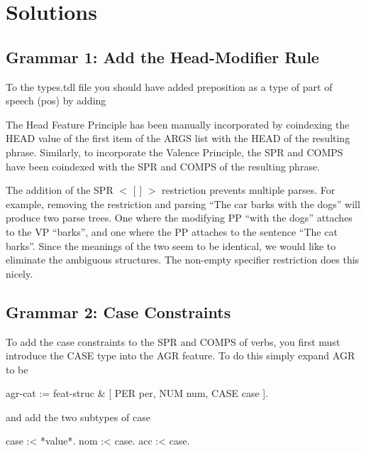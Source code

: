
\section{Solutions}


\subsection{Grammar 1: Add the Head-Modifier Rule}

To the types.tdl file you should have added preposition as a type of part of speech (pos) by adding 

The Head Feature Principle has been manually incorporated by coindexing the HEAD value of the first item of the ARGS list with the HEAD of the resulting phrase.  Similarly, to incorporate the Valence Principle, the SPR and COMPS have been coindexed with the SPR and COMPS of the resulting phrase.  

The addition of the SPR $<$ [ ] $>$ restriction prevents multiple parses.  For example, removing the restriction and parsing ``The car barks with the dogs'' will produce two parse trees.  One where the modifying PP ``with the dogs'' attaches to the VP ``barks'', and one where the PP attaches to the sentence ``The cat barks''.  Since the meanings of the two seem to be identical, we would like to eliminate the ambiguous structures.  The non-empty specifier restriction does this nicely.



\subsection{Grammar 2: Case Constraints}

To add the case constraints to the SPR and COMPS of verbs, you first must introduce the CASE type into the AGR feature.  To do this simply expand AGR to be
\begin{cprog}

agr-cat := feat-struc &
[ PER per,
  NUM num,
  CASE case ].

and add the two subtypes of case 

case :< *value*.
  nom :< case.
  acc :< case.

\end{cprog}


